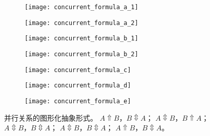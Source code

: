 \begin{figure}[htbp]
  \centering
  \begin{subfigure}{0.48\textwidth}
  	\centering
  	\begin{minipage}[b]{1\textwidth}
  	  \centering
  	  \texttt{[image: concurrent\_formula\_a\_1]}
  	\end{minipage}
  	\begin{minipage}[b]{1\textwidth}
  	  \vspace{1em}
  	  \centering
  	  \texttt{[image: concurrent\_formula\_a\_2]}
  	\end{minipage}
  	\caption{}
  	\label{fig:concurrent_formula_a}
  \end{subfigure}
  \begin{subfigure}{0.48\textwidth}
  	\centering
  	\begin{minipage}[b]{1\textwidth}
  	  \centering
  	  \texttt{[image: concurrent\_formula\_b\_1]}
  	\end{minipage}
  	\begin{minipage}[b]{1\textwidth}
  	  \vspace{1em}
  	  \centering
  	  \texttt{[image: concurrent\_formula\_b\_2]}
  	\end{minipage}
  	\caption{}
  	\label{fig:concurrent_formula_b}
  \end{subfigure}
  \begin{subfigure}{0.48\textwidth}
  	\vspace{1em}
  	\centering
  	\texttt{[image: concurrent\_formula\_c]}
  	\caption{}
  	\label{fig:concurrent_formula_c}
  \end{subfigure}
  \begin{subfigure}{0.48\textwidth}
  	\vspace{1em}
  	\centering
  	\texttt{[image: concurrent\_formula\_d]}
  	\caption{}
  	\label{fig:concurrent_formula_d}
  \end{subfigure}
  \begin{subfigure}{0.48\textwidth}
  	\vspace{1em}
  	\centering
  	\texttt{[image: concurrent\_formula\_e]}
  	\caption{}
  	\label{fig:concurrent_formula_e}
  \end{subfigure}
  \caption{并行关系的图形化抽象形式。 $A\Uparrow B$，$B\Updownarrow A$； $A\Updownarrow B$，$B\Uparrow A$； $A\Updownarrow B$，$B\Updownarrow A$； $A\Updownarrow B$，$B\Updownarrow A$； $A\Uparrow B$，$B\Updownarrow A$。}
  \label{fig:event_concurrent_formulas}
\end{figure}

